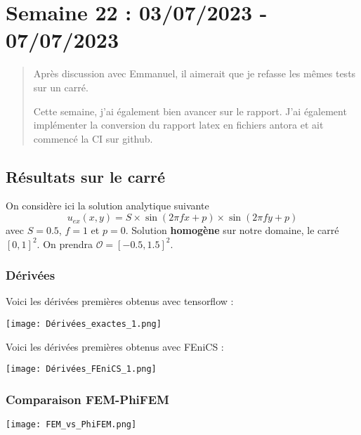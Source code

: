 \section{Semaine 22 : 03/07/2023 - 07/07/2023}
\graphicspath{{semaines/semaine_22/images/}}

\begin{abstract}
	Après discussion avec Emmanuel, il aimerait que je refasse les mêmes tests sur un carré.
	
	Cette semaine, j'ai également bien avancer sur le rapport. J'ai également implémenter la conversion du rapport latex en fichiers antora et ait commencé la CI sur github.
\end{abstract}

\subsection{Résultats sur le carré}

On considère ici la solution analytique suivante
$$u_{ex}(x,y)=S\times\sin(2\pi fx+p)\times\sin(2\pi fy+p)$$
avec $S=0.5$, $f=1$ et $p=0$. Solution \textbf{homogène} sur notre domaine, le carré $[0,1]^2$. On prendra $\mathcal{O}=[-0.5,1.5]^2.$

\subsubsection*{Dérivées}

Voici les dérivées premières obtenus avec tensorflow :

\begin{minipage}{\linewidth}
	\centering
	\texttt{[image: Dérivées\_exactes\_1.png]}
\end{minipage}

Voici les dérivées premières obtenus avec FEniCS :

\begin{minipage}{\linewidth}
	\centering
	\texttt{[image: Dérivées\_FEniCS\_1.png]}
\end{minipage}

\subsubsection*{Comparaison FEM-PhiFEM}

\begin{minipage}{\linewidth}
	\centering
	\texttt{[image: FEM\_vs\_PhiFEM.png]}
\end{minipage}
